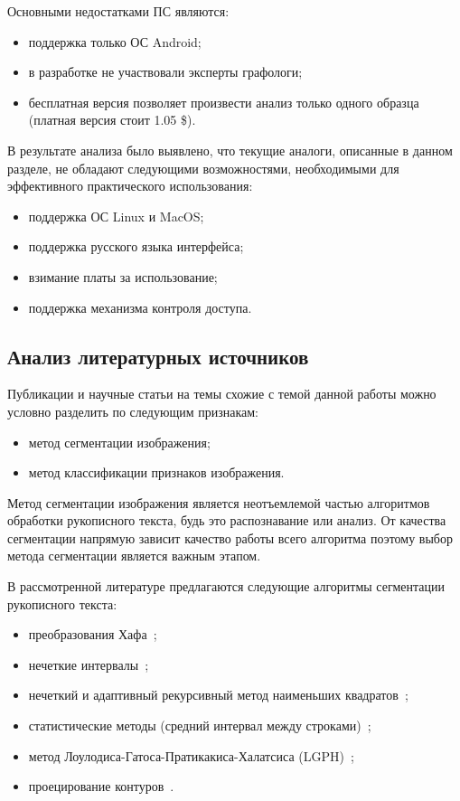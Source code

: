 Основными недостатками ПС являются:
\begin{itemize}
  \item поддержка только ОС Android;
  \item в разработке не участвовали эксперты графологи;
  \item бесплатная версия позволяет произвести анализ только одного образца (платная версия стоит 1.05 \$).
\end{itemize}

В результате анализа было выявлено, что текущие аналоги, описанные в данном разделе, не обладают следующими возможностями, необходимыми для эффективного практического использования:
\begin{itemize}
  \item поддержка ОС Linux и MacOS;
  \item поддержка русского языка интерфейса;
  \item взимание платы за использование;
  \item поддержка механизма контроля доступа.
\end{itemize}

\subsection{Анализ литературных источников}
\label{sub:domain:literary_sources}

Публикации и научные статьи на темы схожие с темой данной работы можно условно разделить по следующим признакам:
\begin{itemize}
  \item метод сегментации изображения;
  \item метод классификации признаков изображения.
\end{itemize}

Метод сегментации изображения является неотъемлемой частью алгоритмов обработки рукописного текста, будь это распознавание или анализ. От качества сегментации напрямую зависит качество работы всего алгоритма поэтому выбор метода сегментации является важным этапом.

В рассмотренной литературе предлагаются следующие алгоритмы сегментации рукописного текста:
\begin{itemize}
  \item преобразования Хафа~\cite{louloudis_gatos_pratikakis_halatsis};
  \item нечеткие интервалы~\cite{louloudis_gatos_pratikakis_halatsis};
  \item нечеткий и адаптивный рекурсивный метод наименьших \mbox{квадратов~\cite{louloudis_gatos_pratikakis_halatsis};}
  \item статистические методы (средний интервал между строками)~\cite{gomathi_umadevi_mohanavel};
  \item метод Лоулодиса-Гатоса-Пратикакиса-Халатсиса (LGPH)~\cite{louloudis_gatos_pratikakis_halatsis};
  \item проецирование контуров~\cite{louloudis_gatos_pratikakis_halatsis}.
\end{itemize}

